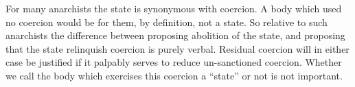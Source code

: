 For many anarchists the state is synonymous with coercion.
A body which used no coercion would be for them, by definition, not a state.
So relative to such anarchists the difference between proposing abolition of the state, and proposing that the state relinquish coercion is purely verbal.
Residual coercion will in either case be justified if it palpably serves to reduce un-sanctioned coercion.
Whether we call the body which exercises this coercion a ``state'' or not is not important.
